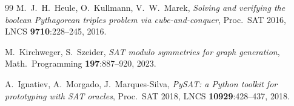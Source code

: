 \documentclass[11pt,a4paper]{article}
\theoremstyle{definition}
\theoremstyle{remark}
\begin{document}
\begin{thebibliography}{99}
M.~J.~H.~Heule, O.~Kullmann, V.~W.~Marek,
\emph{Solving and verifying the boolean Pythagorean triples problem via cube-and-conquer},
Proc.\ SAT 2016, LNCS \textbf{9710}:228--245, 2016.

M.~Kirchweger, S.~Szeider,
\emph{{SAT} modulo symmetries for graph generation},
Math.\ Programming \textbf{197}:887--920, 2023.

A.~Ignatiev, A.~Morgado, J.~Marques-Silva,
\emph{{PySAT}: a {Python} toolkit for prototyping with {SAT} oracles},
Proc.\ SAT 2018, LNCS \textbf{10929}:428--437, 2018.

\end{thebibliography}
\end{document}
